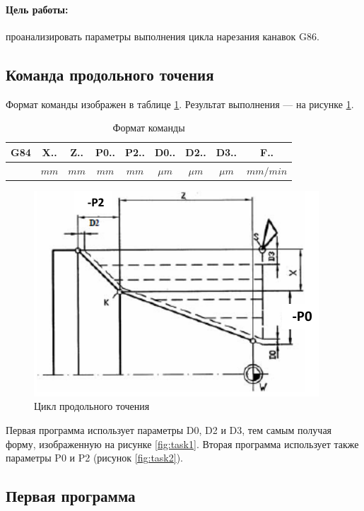\paragraph{Цель работы:} проанализировать параметры выполнения цикла нарезания канавок G86.

\subsection*{Команда продольного точения}

Формат команды изображен в таблице \ref{tab:format}. Результат выполнения --- на рисунке \ref{fig:main}.

\begin{longtable}[c]{|c|c|c|c|c|c|c|c|c|}
    \caption{Формат команды}
    \label{tab:format}\\
    \hline
    \multirow{2}{*}{\textbf{G84}} & \textbf{X..} & \textbf{Z..} & \textbf{P0..} & \textbf{P2..} & \textbf{D0..} & \textbf{D2..} & \textbf{D3..} & \textbf{F..}\\
    \cline{2-9}
    \endfirsthead
        & $mm$ & $mm$ & $mm$ & $mm$ & $\mu m$ & $\mu m$ & $\mu m$ & $mm/min$\\
        \hline
\end{longtable}

\begin{figure}[ht]
    \includegraphics[width=.8\linewidth]{Figures/main.png}
    \caption{Цикл продольного точения}
    \label{fig:main}
\end{figure}

Первая программа использует параметры D0, D2 и D3, тем самым получая форму, изображенную на рисунке \ref{fig:task1}. Вторая программа использует также параметры P0 и P2 (рисунок \ref{fig:task2}).

\subsection*{Первая программа}

